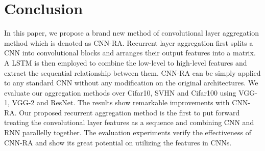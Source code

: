 \documentclass[runningheads]{llncs}
\begin{document}
\section{Conclusion}
In this paper, we propose a brand new method of convolutional layer aggregation method which is denoted as CNN-RA. Recurrent layer aggregation first splits a CNN into convolutional blocks and arranges their output features into a matrix. A LSTM is then employed to combine the low-level to high-level features and extract the sequential relationship between them. CNN-RA can be simply applied to any standard CNN without any modification on the original architectures. We evaluate our aggregation methods over Cifar10, SVHN and Cifar100 using VGG-1, VGG-2 and ResNet. The results show remarkable improvements with CNN-RA. Our proposed recurrent aggregation method is the first to put forward treating the convolutional layer features as a sequence and combining CNN and RNN parallelly together. The evaluation experiments verify the effectiveness of CNN-RA and show its great potential on utilizing the features in CNNs.
\newpage



\end{document}
